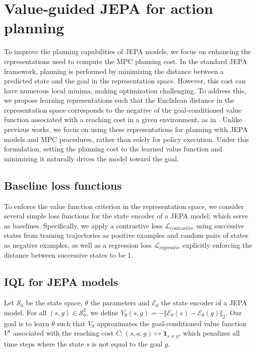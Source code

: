 \section{Value-guided JEPA for action planning}

To improve the planning capabilities of JEPA models, we focus on enhancing the representations used to compute the MPC planning cost. In the standard JEPA framework, planning is performed by minimizing the distance between a predicted state and the goal in the representation space. However, this cost can have numerous local minima, making optimization challenging. To address this, we propose learning representations such that the Euclidean distance in the representation space corresponds to the negative of the goal-conditioned value function associated with a reaching cost in a given environment, as in \cite{hilp}. Unlike previous works, we focus on using these representations for planning with JEPA models and MPC procedures, rather than solely for policy execution. Under this formulation, setting the planning cost to the learned value function and minimizing it naturally drives the model toward the goal.

\subsection{Baseline loss functions}
To enforce the value function criterion in the representation space, we consider several simple loss functions for the state encoder of a JEPA model, which serve as baselines. Specifically, we apply a contrastive loss $\mathcal{L}_\text{contrastive}$ using successive states from training trajectories as positive examples and random pairs of states as negative examples, as well as a regression loss $\mathcal{L}_\text{regressive}$ explicitly enforcing the distance between successive states to be 1.

\subsection{IQL for JEPA models}
Let $\mathcal{S}_0$ be the state space, $\theta$ the parameters and $\mathcal{E}_\theta$ the state encoder of a JEPA model. For all \mbox{$(s, g) \in \mathcal{S}_0^2$}, we define $V_\theta(s, g) = -\Vert \mathcal{E}_\theta(s) - \mathcal{E}_\theta(g) \Vert_2$. Our goal is to learn $\theta$ such that $V_\theta$ approximates the goal-conditioned value function $V^\star$ associated with the reaching cost \mbox{$C: (s, a, g) \mapsto \mathbf{1}_{s \neq g}$}, which penalizes all time steps where the state $s$ is not equal to the goal $g$.


